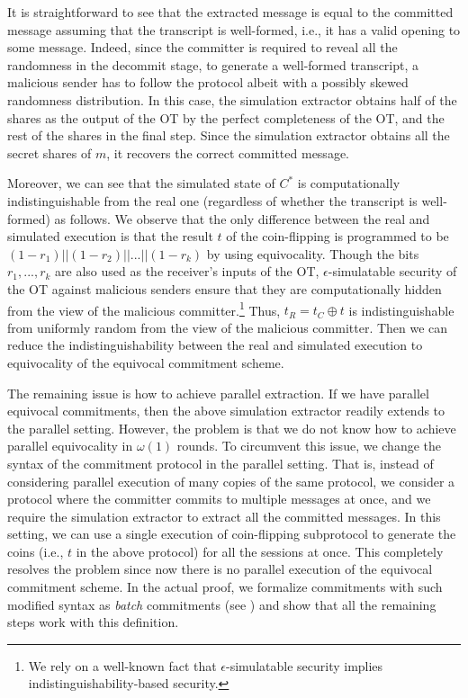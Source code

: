 It is straightforward to see that the extracted message is equal to the committed message assuming that the transcript is well-formed, i.e., it has a valid opening to some message. Indeed, since the committer is required to reveal all the randomness in the decommit stage, to generate a well-formed transcript, a malicious sender has to follow the protocol albeit with a possibly skewed randomness distribution. In this case, the simulation extractor obtains half of the shares as the output of the OT by the perfect completeness of the OT, and the rest of the shares in the final step. 
Since the simulation extractor obtains all the secret shares of $m$, it recovers the correct committed message. 

Moreover, we can see that the simulated state of $C^*$ is computationally indistinguishable from the real one (regardless of whether the transcript is well-formed) as follows. We observe that the only difference between the real and simulated execution is that the result $t$ of the coin-flipping is programmed to be $(1-r_1)||(1-r_2)||...||(1-r_k)$ by using equivocality. Though the bits $r_1,...,r_k$ are also used as the receiver's inputs of the OT,  $\epsilon$-simulatable security of the OT against malicious senders ensure that they are computationally hidden from the view of the malicious committer.\footnote{We rely on a well-known fact that $\epsilon$-simulatable security implies indistinguishability-based security.} Thus, $t_R=t_C\oplus t$ is indistinguishable from uniformly random from the view of the malicious committer. Then we can reduce the indistinguishability between the real and simulated execution to equivocality of the equivocal commitment scheme.  

 The remaining issue is how to achieve parallel extraction. If we have parallel equivocal commitments, then the above simulation extractor readily extends to the parallel setting. However, the problem is that we do not know how to achieve parallel equivocality in $\omega(1)$ rounds. To circumvent this issue, we change the syntax of the commitment protocol in the parallel setting. That is, instead of considering parallel execution of many copies of the same protocol, we consider a protocol where the committer commits to multiple messages at once, and we require the simulation extractor to extract all the committed messages. In this setting, we can use a single execution of coin-flipping subprotocol to generate the coins (i.e., $t$ in the above protocol) for all the sessions at once. This completely resolves the problem since now there is no parallel execution of the equivocal commitment scheme. In the actual proof, we formalize commitments with such modified syntax as \emph{batch} commitments (see ) and show that all the remaining steps work with this definition.   

